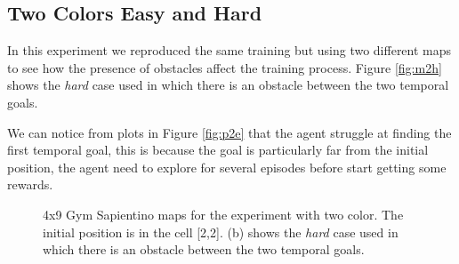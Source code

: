 \documentclass{article}
\begin{document}
\subsection{Two Colors Easy and Hard} %

In this experiment we reproduced the same training but using two different maps to see how the presence of obstacles affect the training process.
Figure \ref{fig:m2h} shows the \textit{hard} case used in which there is an obstacle between the two temporal goals.

We can notice from plots in Figure \ref{fig:p2e} that the agent struggle at finding the first temporal goal, this is because the goal is particularly far from the initial position, the agent need to explore for several episodes before start getting some rewards.

\begin{figure}[h!]
  \centering
  \hfill
  \caption{4x9 Gym Sapientino maps for the experiment with two color. The initial position is in the cell [2,2]. (b) shows the \textit{hard} case used in which there is an obstacle between the two temporal goals.}
\end{figure}
\end{document}
